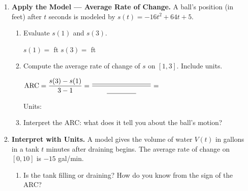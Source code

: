 \documentclass[10pt]{article}
\begin{document}
\begin{enumerate}[itemsep=18pt]
\begin{enumerate}[label=(\alph*), itemsep=8pt]
        \item Compute $F(2 \times 10^7)$ and $F(4 \times 10^7)$. What is the ratio $F(2\times10^7)\,/\,F(4\times10^7)$?

              \vspace{0.06in}
              $F(2\times10^7) = $ \blank{4cm} N \quad $F(4\times10^7) = $ \blank{4cm} N

              Ratio: \blank{3cm} \quad This illustrates the \blank{4cm} law.
      \end{enumerate}

\item \textbf{Apply the Model --- Average Rate of Change.} A ball's position (in feet) after
      $t$ seconds is modeled by $s(t) = -16t^2 + 64t + 5$.

      \begin{enumerate}[label=(\alph*), itemsep=8pt]
        \item Evaluate $s(1)$ and $s(3)$.

              \vspace{0.06in}
              $s(1) = $ \blank{4cm} ft \quad $s(3) = $ \blank{4cm} ft

        \item Compute the average rate of change of $s$ on $[1, 3]$. Include units.

              \vspace{0.06in}
              $\text{ARC} = \dfrac{s(3)-s(1)}{3-1} = \dfrac{\blank{3cm}}{\blank{1.5cm}} = $ \blank{3cm}

              Units: \blank{4cm}

        \item Interpret the ARC: what does it tell you about the ball's motion?

              \vspace{0.06in}
      \end{enumerate}

\item \textbf{Interpret with Units.} A model gives the volume of water $V(t)$ in gallons
      in a tank $t$ minutes after draining begins. The average rate of change on $[0, 10]$ is
      $-15$ gal/min.

      \begin{enumerate}[label=(\alph*), itemsep=8pt]
        \item Is the tank filling or draining? How do you know from the sign of the ARC?

              \vspace{0.06in}
              \writeline


\end{enumerate}
\end{enumerate}
\end{document}
